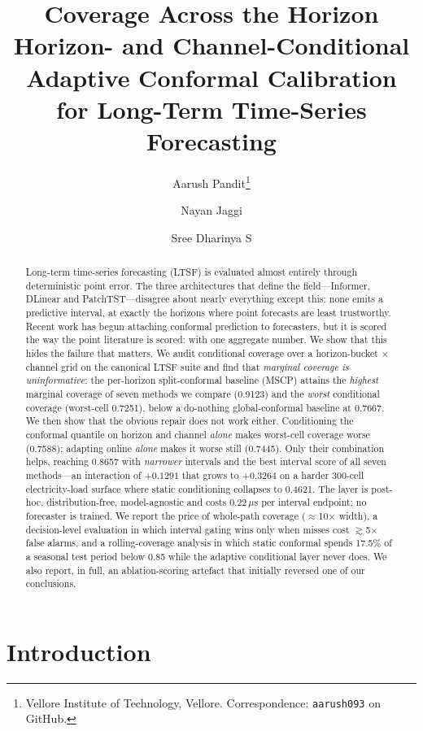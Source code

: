 \documentclass[11pt]{article}
\title{\textbf{Coverage Across the Horizon}\\[2pt]
\large Horizon- and Channel-Conditional Adaptive Conformal Calibration\\for Long-Term Time-Series Forecasting}
\author{Aarush Pandit\thanks{Vellore Institute of Technology, Vellore. Correspondence: \texttt{aarush093} on GitHub.} \and Nayan Jaggi \and Sree Dharinya S}
\date{}
\begin{document}
\maketitle

\begin{abstract}
Long-term time-series forecasting (LTSF) is evaluated almost entirely through deterministic point error. The three architectures that define the field---Informer, DLinear and PatchTST---disagree about nearly everything except this: none emits a predictive interval, at exactly the horizons where point forecasts are least trustworthy. Recent work has begun attaching conformal prediction to forecasters, but it is scored the way the point literature is scored: with one aggregate number. We show that this hides the failure that matters. We audit conditional coverage over a horizon-bucket $\times$ channel grid on the canonical LTSF suite and find that \emph{marginal coverage is uninformative}: the per-horizon split-conformal baseline (MSCP) attains the \emph{highest} marginal coverage of seven methods we compare (0.9123) and the \emph{worst} conditional coverage (worst-cell 0.7251), below a do-nothing global-conformal baseline at 0.7667. We then show that the obvious repair does not work either. Conditioning the conformal quantile on horizon and channel \emph{alone} makes worst-cell coverage worse (0.7588); adapting online \emph{alone} makes it worse still (0.7445). Only their combination helps, reaching 0.8657 with \emph{narrower} intervals and the best interval score of all seven methods---an interaction of $+0.1291$ that grows to $+0.3264$ on a harder 300-cell electricity-load surface where static conditioning collapses to 0.4621. The layer is post-hoc, distribution-free, model-agnostic and costs $0.22\,\mu$s per interval endpoint; no forecaster is trained. We report the price of whole-path coverage ($\approx$10$\times$ width), a decision-level evaluation in which interval gating wins only when misses cost $\gtrsim$5$\times$ false alarms, and a rolling-coverage analysis in which static conformal spends 17.5\% of a seasonal test period below 0.85 while the adaptive conditional layer never does. We also report, in full, an ablation-scoring artefact that initially reversed one of our conclusions.
\end{abstract}

\section{Introduction}
\end{document}
